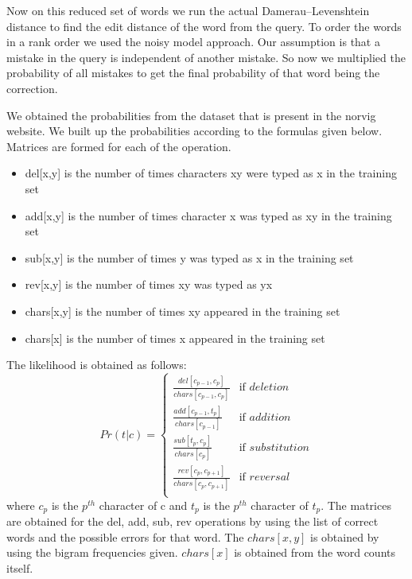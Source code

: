 \documentclass{article}
\begin{document}
\par Now on this reduced set of words we run the actual Damerau–Levenshtein distance to find the edit distance of the word from the query. To order the words in a rank order we used the noisy model approach. Our assumption is that a mistake in the query is independent of another mistake. So now we multiplied the probability of all mistakes to get the final probability of that word being the correction.\\
\par We obtained the probabilities from the dataset that is present in the norvig website. We built up the probabilities according to the formulas given below. Matrices are formed for each of the operation.

\begin{itemize}
\item del[x,y] is the number of times characters xy were typed as x in the training set
\item add[x,y] is the number of times character x was typed as xy in the training set
\item sub[x,y] is the number of times y was typed as x in the training set
\item rev[x,y] is the number of times xy was typed as yx
\item chars[x,y] is the number of times xy appeared in the training set
\item chars[x] is the number of times x appeared in the training set
\end{itemize}

The likelihood is obtained as follows:
\[ Pr(t|c) = 
\left\{
	\begin{array}{ll}
		\frac{del[c_{p-1},c_{p}]}{chars[c_{p-1},c_{p}]}  & \mbox{if } deletion \\
		\frac{add[c_{p-1},t_{p}]}{chars[c_{p-1}]} & \mbox{if } addition \\
		\frac{sub[t_{p},c_{p}]}{chars[c_{p}]} & \mbox{if } substitution \\
		\frac{rev[c_{p},c_{p+1}]}{chars[c_{p},c_{p+1}]} & \mbox{if } reversal \\
	\end{array}
\right.
\] 
where $c_{p}$ is the $p^{th}$ character of c and $t_{p}$ is the $p^{th}$ character of $t_{p}$. The matrices are obtained for the del, add, sub, rev operations by using the list of correct words and the possible errors for that word. The $chars[x,y]$ is obtained by using the bigram frequencies given. $chars[x]$ is obtained from the word counts itself.  
\end{document}
